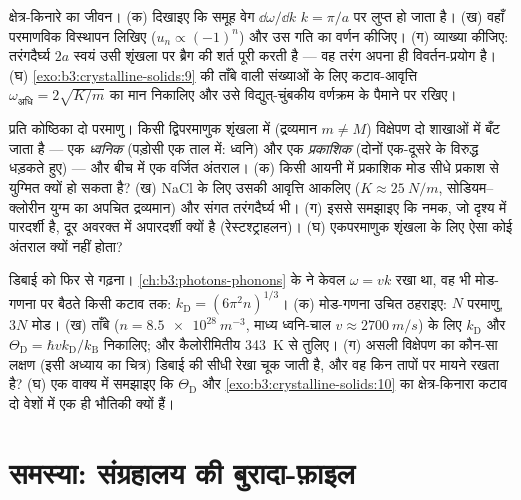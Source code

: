 \begin{exercise}[$\star\star\star$]\label{exo:b3:crystalline-solids:10}
क्षेत्र-किनारे का जीवन। (क) दिखाइए कि समूह वेग
$\dd\omega/\dd k$ $k = \pi/a$ पर लुप्त हो जाता है। (ख) वहाँ परमाणविक
विस्थापन लिखिए ($u_n \propto (-1)^n$) और उस गति का वर्णन कीजिए। (ग)
व्याख्या कीजिए: तरंगदैर्घ्य $2a$ स्वयं उसी शृंखला पर ब्रैग की शर्त
पूरी करती है --- वह तरंग अपना ही विवर्तन-प्रयोग है। (घ)
\cref{exo:b3:crystalline-solids:9} की ताँबे वाली संख्याओं के लिए
कटाव-आवृत्ति $\omega_{\text{अधि}} = 2\sqrt{K/m}$ का मान निकालिए और
उसे विद्युत्-चुंबकीय वर्णक्रम के पैमाने पर रखिए।
\end{exercise}

\begin{exercise}[$\star\star\star$]\label{exo:b3:crystalline-solids:11}
प्रति कोष्ठिका दो परमाणु। किसी द्विपरमाणुक शृंखला में (द्रव्यमान
$m \ne M$) विक्षेपण दो शाखाओं में बँट जाता है --- एक \emph{ध्वनिक}
(पड़ोसी एक ताल में: ध्वनि) और एक \emph{प्रकाशिक} (दोनों 
एक-दूसरे के विरुद्ध धड़कते हुए) --- और बीच में एक वर्जित अंतराल। (क)
किसी आयनी  में प्रकाशिक मोड सीधे प्रकाश से युग्मित क्यों हो
सकता है? (ख) NaCl के लिए उसकी आवृत्ति आकलिए ($K \approx
\qty{25}{N/m}$, सोडियम--क्लोरीन युग्म का अपचित द्रव्यमान) और
संगत तरंगदैर्घ्य भी। (ग) इससे समझाइए कि नमक, जो दृश्य में पारदर्शी
है, दूर अवरक्त में अपारदर्शी क्यों है (रेस्टश्ट्राहलन)। (घ)
एकपरमाणुक शृंखला के लिए ऐसा कोई अंतराल क्यों नहीं होता?
\end{exercise}

\begin{exercise}[$\star\star\star$]\label{exo:b3:crystalline-solids:12}
डिबाई को फिर से गढ़ना। \cref{ch:b3:photons-phonons} के 
ने केवल $\omega = vk$ रखा था, वह भी मोड-गणना पर बैठते किसी कटाव तक:
$k_{\text{D}} = (6\pi^2n)^{1/3}$। (क) मोड-गणना उचित ठहराइए:
$N$ परमाणु, $3N$ मोड। (ख) ताँबे ($n = \qty{8.5e28}{m^{-3}}$,
माध्य ध्वनि-चाल $v \approx \qty{2700}{m/s}$) के लिए
$k_{\text{D}}$ और $\Theta_{\text{D}} =
\hbar vk_{\text{D}}/k_{\text{B}}$ निकालिए; और कैलोरीमितीय
\qty{343}{K} से तुलिए। (ग) असली विक्षेपण का कौन-सा लक्षण (इसी अध्याय
का चित्र) डिबाई की सीधी रेखा चूक जाती है, और वह किन तापों पर मायने
रखता है? (घ) एक वाक्य में समझाइए कि
$\Theta_{\text{D}}$ और \cref{exo:b3:crystalline-solids:10} का
क्षेत्र-किनारा कटाव दो वेशों में एक ही भौतिकी क्यों हैं।
\end{exercise}

\section{समस्या: संग्रहालय की बुरादा-फ़ाइल}

